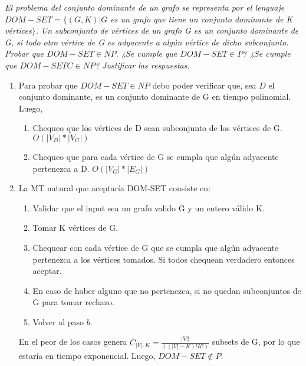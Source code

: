 \documentclass[lnbip]{svmultln}
\begin{document}
\textit{El problema del conjunto dominante de un grafo se representa por el lenguaje $DOM-SET = \{(G, K) | G$ es un grafo que tiene un conjunto dominante de K vértices$\}$. Un subconjunto de vértices de un grafo G es un conjunto dominante de G, si todo otro vértice de G es adyacente a algún vértice de dicho subconjunto. Probar que $DOM-SET \in NP$. ¿Se cumple que $DOM-SET \in P$? ¿Se cumple que $DOM-SETC \in NP$? Justificar las respuestas.} \\

\begin{enumerate}
    \item Para probar que $DOM-SET \in NP$ debo poder verificar que, sea $D$ el conjunto dominante, es un conjunto dominante de G en tiempo polinomial. Luego, \\

    \begin{enumerate}
        \item Chequeo que los vértices de D sean subconjunto de los vértices de G. $O(|V_{D}|*|V_{G}|)$
        \item Chequeo que para cada vértice de G se cumpla que algún adyacente pertenezca a D. $O(|V_{G}|*|E_{G}|)$ \\
    \end{enumerate}
    
    \item La MT natural que aceptaría DOM-SET consiste en: \\
    
    \begin{enumerate}
        \item Validar que el input sea un grafo valido G y un entero válido K.
        \item Tomar K vértices de G. 
        \item Chequear con cada vértice de G que se cumpla que algún adyacente pertenezca a los vértices tomados. Si todos chequean verdadero entonces aceptar. 
        \item En caso de haber alguno que no pertenezca, si no quedan subconjuntos de G para tomar rechazo. 
        \item Volver al paso $b$. \\
    \end{enumerate}
    
    En el peor de los casos genera $C_{|V|, K} = \frac{|V|!}{((|V|-K)!K!)}$ subsets de G, por lo que estaría en tiempo exponencial. Luego, $DOM-SET \notin P$. \\
    

\end{enumerate}
\end{document}
